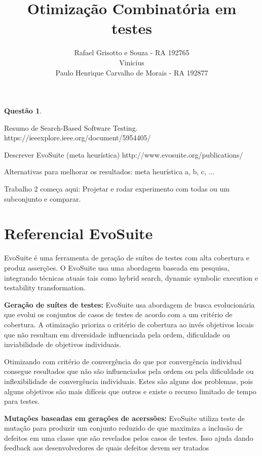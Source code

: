 \documentclass[12pt,a4paper]{article}
\title{Otimização Combinatória em  \\ testes}
\author{Rafael Grisotto e Souza - RA 192765\\ Vinicius \\ Paulo Henrique Carvalho de Morais - RA 192877}
\newtheorem{questao}{Questão}
\begin{document}
\maketitle


\begin{questao}
\end{questao}

Resumo de Search-Based Software Testing.
https://ieeexplore.ieee.org/document/5954405/

Descrever EvoSuite (meta heurística)
http://www.evosuite.org/publications/

Alternativas para melhorar os resultados: meta heurística a, b, c, ...


Trabalho 2 começa aqui:
\cite{arcuri2017restful}
Projetar e rodar experimento com todas ou um subconjunto e comparar.

\listoftodos[Notes]



\newpage

\section{Referencial EvoSuite}

EvoSuite é uma ferramenta de geração de suítes de testes com alta cobertura e produz asserções. O EvoSuite usa uma abordagem baseada em pesquisa, integrando técnicas atuais tais como hybrid
search, dynamic symbolic execution e testability transformation. 

\textbf{Geração de suítes de testes:} EvoSuite usa abordagem de busca evolucionária que evolui os conjuntos de casos de testes de acordo com a um critério de cobertura. A otimização prioriza
o critério de cobertura ao invés objetivos locais que não resultam em diversidade influenciada pela ordem, dificuldade ou inviabilidade de objetivos individuais.

Otimizando com critério de convergência do que por convergência individual consegue resultados que não são influenciados pela ordem ou pela dificuldade ou inflexibilidade de convergência
individuais. Estes são alguns dos problemas, pois alguns objetivos são mais difíceis que outros e existe o recurso limitado de tempo para testes.

\textbf{Mutações baseadas em gerações de acerssões:} EvoSuite utiliza teste de mutação para produzir um conjunto reduzido de que maximiza a inclusão de defeitos em uma classe que são revelados pelos casos de testes. Isso ajuda dando feedback aos desenvolvedores de quais defeitos devem ser tratados 
\end{document}
